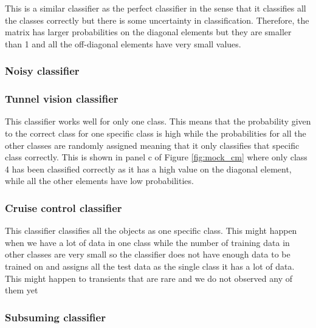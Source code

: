 This is a similar classifier as the perfect classifier in the sense that it classifies all the classes correctly but there is some uncertainty in classification.
Therefore, the matrix has larger probabilities on the diagonal elements but they are smaller than 1 and all the off-diagonal elements have very small values.

\subsubsection{Noisy classifier}
\label{sec:nois_datay}


\subsubsection{Tunnel vision classifier}
\label{sec:tunnel_data}

This classifier works well for only one class.
This means that the probability given to the correct class for one specific class is high while the probabilities for all the other classes are randomly assigned meaning that it only classifies that specific class correctly.
This is shown in panel c of Figure \ref{fig:mock_cm} where only class 4 has been classified correctly as it has a high value on the diagonal element, while all the other elements have low probabilities.

\subsubsection{Cruise control classifier}
\label{sec:cruise_data}

This classifier classifies all the objects as one specific class.
This might happen when we have a lot of data in one class while the number of training data in other classes are very small so the classifier does not have enough data to be trained on and assigns all the test data as the single class it has a lot of data.
This might happen to transients that are rare and we do not observed any of them yet 

\subsubsection{Subsuming classifier}
\label{sec:subsume_data}

